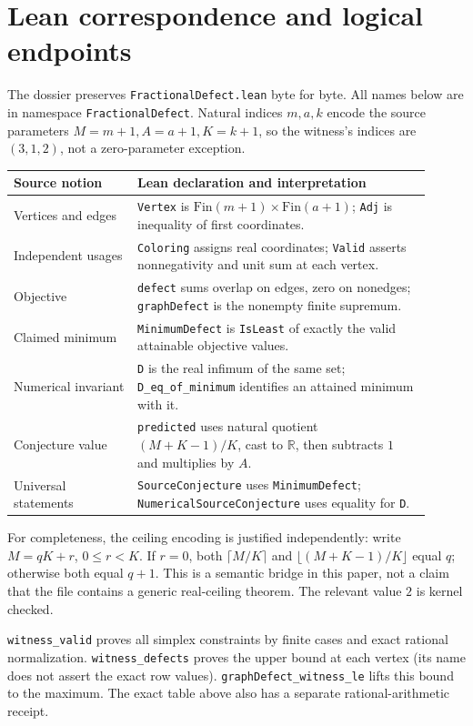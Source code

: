 \documentclass[11pt]{article}
\newcommand{\code}[1]{\texttt{\small #1}}
\begin{document}
\section{Lean correspondence and logical endpoints}
The dossier preserves \code{FractionalDefect.lean} byte for byte. All names
below are in namespace \code{FractionalDefect}. Natural indices $m,a,k$
encode the source parameters $M=m+1,A=a+1,K=k+1$, so the witness's indices
are $(3,1,2)$, not a zero-parameter exception.
\begin{center}\small
\begin{tabular}{p{0.27\linewidth}p{0.64\linewidth}}
\toprule Source notion & Lean declaration and interpretation\\\midrule
Vertices and edges & \code{Vertex} is $\mathrm{Fin}(m+1)\times\mathrm{Fin}(a+1)$;
\code{Adj} is inequality of first coordinates.\\
Independent usages & \code{Coloring} assigns real coordinates;
\code{Valid} asserts nonnegativity and unit sum at each vertex.\\
Objective & \code{defect} sums overlap on edges, zero on nonedges;
\code{graphDefect} is the nonempty finite supremum.\\
Claimed minimum & \code{MinimumDefect} is \code{IsLeast} of exactly the
valid attainable objective values.\\
Numerical invariant & \code{D} is the real infimum of the same set;
\code{D\_eq\_of\_minimum} identifies an attained minimum with it.\\
Conjecture value & \code{predicted} uses natural quotient
$(M+K-1)/K$, cast to $\mathbb R$, then subtracts $1$ and multiplies by $A$.\\
Universal statements & \raggedright\arraybackslash\code{SourceConjecture} uses \code{MinimumDefect};
\code{NumericalSourceConjecture} uses equality for \code{D}.\\\bottomrule
\end{tabular}\end{center}
For completeness, the ceiling encoding is justified independently: write
$M=qK+r$, $0\leq r<K$. If $r=0$, both $\lceil M/K\rceil$ and
$\lfloor(M+K-1)/K\rfloor$ equal $q$; otherwise both equal $q+1$.
This is a semantic bridge in this paper, not a claim that the file contains
a generic real-ceiling theorem. The relevant value $2$ is kernel checked.

\code{witness\_valid} proves all simplex constraints by finite cases and exact
rational normalization. \code{witness\_defects} proves the upper bound at
each vertex (its name does not assert the exact row values).
\code{graphDefect\_witness\_le} lifts this bound to the maximum.
The exact table above also has a separate rational-arithmetic receipt.
\end{document}
